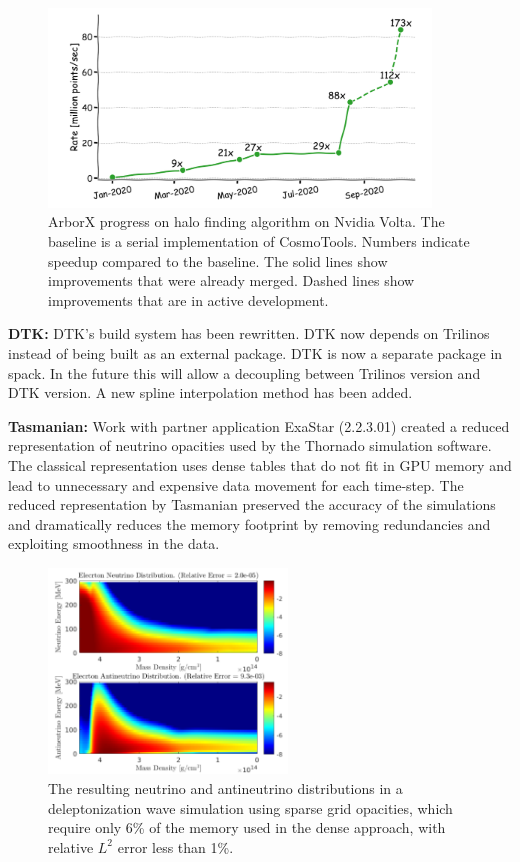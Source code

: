 \begin{figure}[htb]
        \centering \includegraphics[width=4.0in]{projects/2.3.3-MathLibs/2.3.3.14-ALExa-ForTrilinos/arborx_hacc_progress.png} \caption{\label{fig:arborx-hacc}
        ArborX progress on halo finding algorithm on Nvidia Volta. The baseline
        is a serial implementation of CosmoTools. Numbers indicate speedup
        compared to the baseline. The solid lines show improvements that were
        already merged. Dashed lines show improvements that are in active
        development. }
\end{figure}

{\bf DTK:} DTK's build system has been rewritten. DTK now depends on Trilinos
instead of being built as an external package. DTK is now a separate package in
spack. In the future this will allow a decoupling between Trilinos version and
DTK version. A new spline interpolation method has been added.

{\bf Tasmanian:} Work with partner application ExaStar (2.2.3.01) created a
reduced representation of neutrino opacities used by the Thornado simulation
software. The classical representation uses dense tables that do not fit in
GPU memory and lead to unnecessary and expensive data movement for each time-step.
The reduced representation by Tasmanian preserved the accuracy of the simulations
and dramatically reduces the memory footprint by removing redundancies
and exploiting smoothness in the data.

\begin{figure}[htb]
        \centering
        \includegraphics[width=2.5in]{projects/2.3.3-MathLibs/2.3.3.14-ALExa-ForTrilinos/tasmanian_exastar}
\caption{\label{fig:tasmanian-exastar}
		The resulting neutrino and antineutrino distributions in a deleptonization
		wave simulation using sparse grid opacities, which require only 6\% of
		the memory used in the dense approach, with relative $L^2$ error less than 1\%.}
\end{figure}

